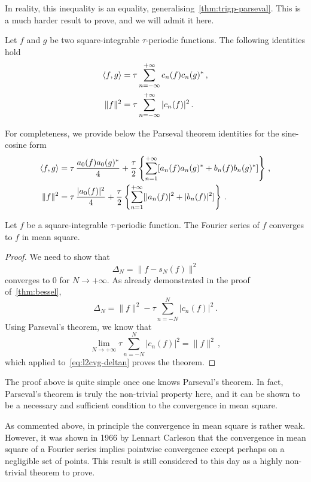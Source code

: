 In reality, this inequality is an equality, generalising~\cref{thm:trigp-parseval}. This
is a much harder result to prove, and we will admit it here.
\begin{theorem}[Parseval]
  \label{thm:parseval}
  Let $f$ and $g$ be two square-integrable $\tau$-periodic functions. The following
  identities hold
  \begin{align}
    \braket{f,g}&=\tau\sum_{n=-\infty}^{+\infty}c_n(f)c_n(g)^*\,,
    \label{eq:fs-dot}\\
    \|f\|^2&=\tau\sum_{n=-\infty}^{+\infty}|c_n(f)|^2\,.
    \label{eq:fs-norm}
  \end{align}
\end{theorem}
For completeness, we provide below the Parseval theorem identities for the sine-cosine
form
\begin{align}
  \braket{f,g}&=\tau\,\frac{a_0(f)a_0(g)^*}{4}
  +\frac{\tau}{2}\left\{\sum_{n=1}^{+\infty}[a_n(f)a_n(g)^*+b_n(f)b_n(g)^*]\right\}\,,\\
  \|f\|^2&=\tau\,\frac{|a_0(f)|^2}{4}
  +\frac{\tau}{2}\left\{\sum_{n=1}^{+\infty}[|a_n(f)|^2+|b_n(f)|^2]\right\}\,.
\end{align}
\begin{theorem}
  Let $f$ be a square-integrable $\tau$-periodic function. The Fourier series of $f$
  converges to $f$ in mean square.
\end{theorem}
\begin{proof}
  We need to show that
  \begin{equation}
    \Delta_N =\|f-s_N(f)\|^2
  \end{equation}
  converges to $0$ for $N\to+\infty$. As already demonstrated in the proof
  of~\cref{thm:bessel},
  \begin{equation}
    \Delta_N =\|f\|^2-\tau\sum_{n=-N}^{N}|c_n(f)|^2\,.\label{eq:l2cvg-deltan}
  \end{equation}
  Using Parseval's theorem, we know that
  \begin{equation}
    \lim_{N\to+\infty}\tau\sum_{n=-N}^{N}|c_n(f)|^2=\|f\|^2\,,
  \end{equation}
  which applied to~\cref{eq:l2cvg-deltan} proves the theorem.
\end{proof}
The proof above is quite simple once one knows Parseval's theorem. In fact, Parseval's
theorem is truly the non-trivial property here, and it can be shown to be a necessary and
sufficient condition to the convergence in mean square.

As commented above, in principle the convergence in mean square is rather weak. However,
it was shown in 1966 by Lennart Carleson that the convergence in mean square of a Fourier
series implies pointwise convergence except perhaps on a negligible set of points. This
result is still considered to this day as a highly non-trivial theorem to prove.

